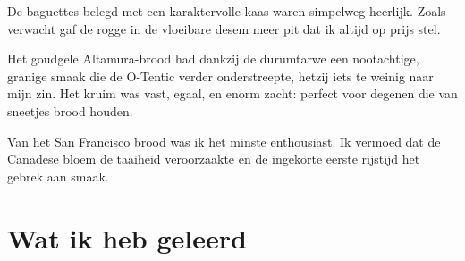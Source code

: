 \documentclass[
  11pt,
  dutch,
]{memoir}
\begin{document}
De baguettes belegd met een karaktervolle kaas waren simpelweg heerlijk.
Zoals verwacht gaf de rogge in de vloeibare desem meer pit dat ik altijd
op prijs stel.

Het goudgele Altamura-brood had dankzij de durumtarwe een nootachtige,
granige smaak die de O-Tentic verder onderstreepte, hetzij iets te
weinig naar mijn zin. Het kruim was vast, egaal, en enorm zacht: perfect
voor degenen die van sneetjes brood houden.

Van het San Francisco brood was ik het minste enthousiast. Ik vermoed
dat de Canadese bloem de taaiheid veroorzaakte en de ingekorte eerste
rijstijd het gebrek aan smaak.

\newpage

\hypertarget{wat-ik-heb-geleerd-6}{%
\section{Wat ik heb geleerd}\label{wat-ik-heb-geleerd-6}}
\end{document}
